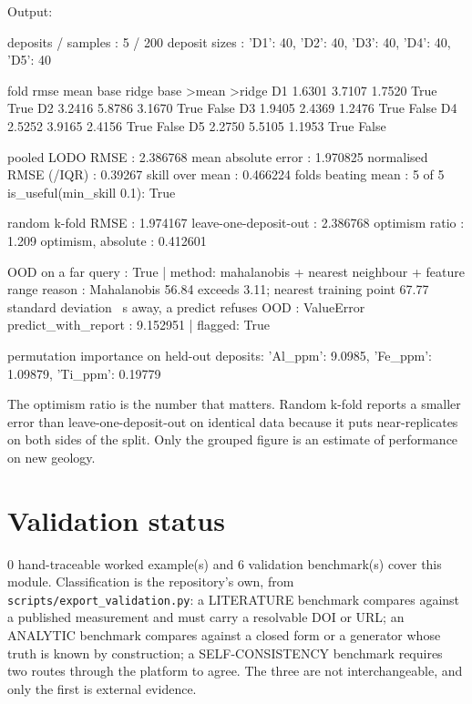 \documentclass[10pt,a4paper,twoside]{report}
\begin{document}
{\footnotesize\color{slate}Output:\par}

\begin{outputblock}
deposits / samples      : 5 / 200
deposit sizes           : {'D1': 40, 'D2': 40, 'D3': 40, 'D4': 40, 'D5': 40}

fold      rmse  mean base  ridge base  >mean  >ridge
D1      1.6301     3.7107      1.7520   True    True
D2      3.2416     5.8786      3.1670   True   False
D3      1.9405     2.4369      1.2476   True   False
D4      2.5252     3.9165      2.4156   True   False
D5      2.2750     5.5105      1.1953   True   False

pooled LODO RMSE        : 2.386768
mean absolute error     : 1.970825
normalised RMSE (/IQR)  : 0.39267
skill over mean         : 0.466224
folds beating mean      : 5 of 5
is_useful(min_skill 0.1): True

random k-fold RMSE      : 1.974167
leave-one-deposit-out   : 2.386768
optimism ratio          : 1.209
optimism, absolute      : 0.412601

OOD on a far query      : True | method: mahalanobis + nearest neighbour + feature range
reason                  : Mahalanobis 56.84 exceeds 3.11; nearest training point 67.77 standard deviation
    \ s away, a
predict refuses OOD     : ValueError
predict_with_report     : 9.152951 | flagged: True

permutation importance on held-out deposits: {'Al_ppm': 9.0985, 'Fe_ppm': 1.09879, 'Ti_ppm': 0.19779}
\end{outputblock}

The optimism ratio is the number that matters. Random k-fold reports a smaller error than leave-one-deposit-out on identical data because it puts near-replicates on both sides of the split. Only the grouped figure is an estimate of performance on new geology.

\section{Validation status}

0 hand-traceable worked example(s) and 6 validation benchmark(s) cover this module. Classification is the repository's own, from \texttt{scripts/export\_validation.py}: a LITERATURE benchmark compares against a published measurement and must carry a resolvable DOI or URL; an ANALYTIC benchmark compares against a closed form or a generator whose truth is known by construction; a SELF-CONSISTENCY benchmark requires two routes through the platform to agree. The three are not interchangeable, and only the first is external evidence.
\end{document}
